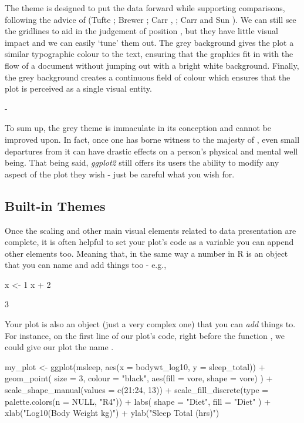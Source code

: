 \begin{displayquote}
\headingfont
The theme is designed to put the data forward while supporting comparisons, following the advice of (Tufte \citeyear{Tufte2006}; Brewer \citeyear{Brewer1994}; Carr \citeyear{Carr2002}, \citeyear{Carr1994}; Carr and Sun \citeyear{Carr1999}). We can still see the gridlines to aid in the judgement of position \parencite{Cleveland1993}, but they have little visual impact and we can easily `tune' them out. The grey background gives the plot a similar typographic colour to the text, ensuring that the graphics fit in with the flow of a document without jumping out with a bright white background. Finally, the grey background creates a continuous field of colour which ensures that the plot is perceived as a single visual entity.

- \cite{Wickham_ggplot2}

\end{displayquote}

\noindent
To sum up, the grey theme is immaculate in its conception and cannot be improved upon. In fact, once one has borne witness to the majesty of , even small departures from it can have drastic effects on a person's physical and mental well being. That being said, \textit{ggplot2} still offers its users the ability to modify any aspect of the plot they wish - just be careful what you wish for.

\subsection{Built-in Themes}

Once the scaling and other main visual elements related to data presentation are complete, it is often helpful to set your plot's code as a variable you can append other elements too. Meaning that, in the same way a number in R is an object that you can name and add things too - e.g., 

\begin{inR}
x <- 1
x + 2
\end{inR}
\begin{outR}
[1] 3
\end{outR}

\noindent
Your plot is also an object (just a very complex one) that you can \textit{add} things to. For instance, on the first line of our plot's code, right before the function , we could give our plot the name .

\begin{inR}
my_plot <- ggplot(msleep, aes(x = bodywt_log10, y = sleep_total)) +
  geom_point(
    size = 3, colour = "black",
    aes(fill = vore, shape = vore)
  ) +
  scale_shape_manual(values = c(21:24, 13)) +
  scale_fill_discrete(type = palette.colors(n = NULL, "R4")) +
  labs(
    shape = "Diet",
    fill = "Diet"
  ) +
  xlab("Log10(Body Weight kg)") + ylab("Sleep Total (hrs)")
\end{inR}

